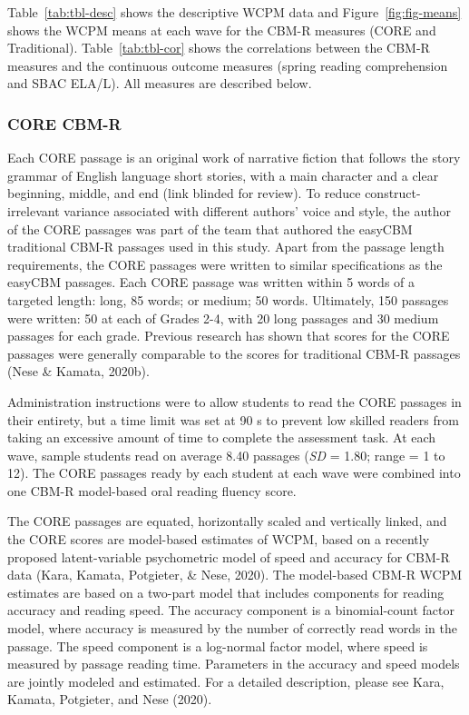 \documentclass[
  english,
  man, fleqn, noextraspace]{apa6}
\begin{document}
Table~\ref{tab:tbl-desc} shows the descriptive WCPM data and Figure~\ref{fig:fig-means} shows the WCPM means at each wave for the CBM-R measures (CORE and Traditional). Table~\ref{tab:tbl-cor} shows the correlations between the CBM-R measures and the continuous outcome measures (spring reading comprehension and SBAC ELA/L). All measures are described below.

\hypertarget{core-cbm-r}{%
\subsubsection{CORE CBM-R}\label{core-cbm-r}}

Each CORE passage is an original work of narrative fiction that follows the story grammar of English language short stories, with a main character and a clear beginning, middle, and end (link blinded for review). To reduce construct-irrelevant variance associated with different authors' voice and style, the author of the CORE passages was part of the team that authored the easyCBM traditional CBM-R passages used in this study. Apart from the passage length requirements, the CORE passages were written to similar specifications as the easyCBM passages. Each CORE passage was written within 5 words of a targeted length: long, 85 words; or medium; 50 words. Ultimately, 150 passages were written: 50 at each of Grades 2-4, with 20 long passages and 30 medium passages for each grade. Previous research has shown that scores for the CORE passages were generally comparable to the scores for traditional CBM-R passages (Nese \& Kamata, 2020b).

Administration instructions were to allow students to read the CORE passages in their entirety, but a time limit was set at 90 s to prevent low skilled readers from taking an excessive amount of time to complete the assessment task. At each wave, sample students read on average 8.40 passages (\emph{SD} = 1.80; range = 1 to 12). The CORE passages ready by each student at each wave were combined into one CBM-R model-based oral reading fluency score.

The CORE passages are equated, horizontally scaled and vertically linked, and the CORE scores are model-based estimates of WCPM, based on a recently proposed latent-variable psychometric model of speed and accuracy for CBM-R data (Kara, Kamata, Potgieter, \& Nese, 2020). The model-based CBM-R WCPM estimates are based on a two-part model that includes components for reading accuracy and reading speed. The accuracy component is a binomial-count factor model, where accuracy is measured by the number of correctly read words in the passage. The speed component is a log-normal factor model, where speed is measured by passage reading time. Parameters in the accuracy and speed models are jointly modeled and estimated. For a detailed description, please see Kara, Kamata, Potgieter, and Nese (2020).
\end{document}
